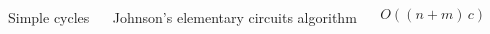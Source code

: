 \begin{minipage}[t]{\textwidth}
    \begin{columns}
        \begin{column}{0.25\textwidth}
        \centering
        Simple cycles
        \end{column}
    \hfill
        \begin{column}{0.25\textwidth}
        \centering
        Johnson's elementary circuits algorithm
        \end{column}
    \hfill
        \begin{column}{0.25\textwidth}
        \centering
        $O((n+m) \, c)$
        \end{column}
    \hfill
        \begin{column}{0.25\textwidth}
        \centering
        \resizebox{0.65\textwidth}{!}{}
        \end{column}
    \end{columns}
\end{minipage}